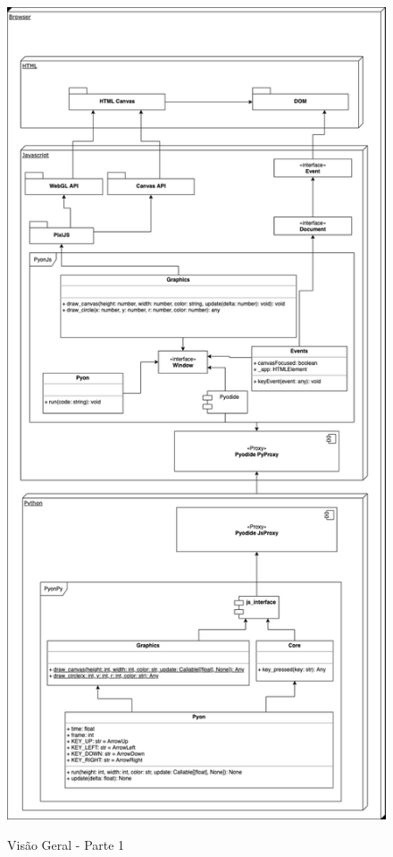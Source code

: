\begin{apendicesenv}
\begin{figure}[!h]
    \centering
    \caption{Visão Geral - Parte 1}
    \includegraphics[trim={0 23cm 0 0},clip,keepaspectratio=true,scale=0.8]{figuras/Arquitetura.eps}
    \label{fig:arquitetura}
\end{figure}


\end{apendicesenv}
